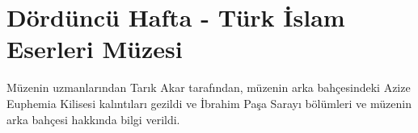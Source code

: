 \section{Dördüncü Hafta - Türk İslam Eserleri Müzesi}
\indent\indent Müzenin uzmanlarından Tarık Akar tarafından, müzenin arka bahçesindeki Azize Euphemia Kilisesi kalıntıları gezildi ve İbrahim Paşa Sarayı bölümleri ve müzenin arka bahçesi hakkında bilgi verildi.

